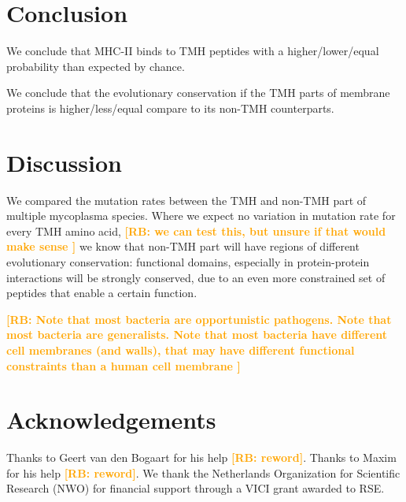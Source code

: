 \documentclass{article}
\newcommand{\richel}[1]{\textcolor{orange}{\textbf{[RB: #1]}}}
\begin{document}
\section{Conclusion}

We conclude that MHC-II binds to TMH peptides with a higher/lower/equal
probability than expected by chance. 

We conclude that the evolutionary conservation if the TMH parts of membrane
proteins is higher/less/equal compare to its non-TMH counterparts.

\section{Discussion}

We compared the mutation rates between the TMH and non-TMH part of
multiple mycoplasma species. Where we expect no variation 
in mutation rate for every TMH amino acid,
\richel{
  we can test this, but unsure if that would make sense
}
we know that non-TMH part will have regions of different evolutionary
conservation: functional domains, especially in protein-protein
interactions will be strongly conserved, due to an even more constrained
set of peptides that enable a certain function.

\richel{
  Note that most bacteria are opportunistic pathogens.
  Note that most bacteria are generalists.
  Note that most bacteria have different cell membranes (and walls), that
  may have different functional constraints than a human cell membrane
}

\section{Acknowledgements}

Thanks to Geert van den Bogaart for his help \richel{reword}.
Thanks to Maxim for his help \richel{reword}.
We thank the Netherlands 
Organization for Scientific Research (NWO) for financial support 
through a VICI grant awarded to RSE.

\end{document}
